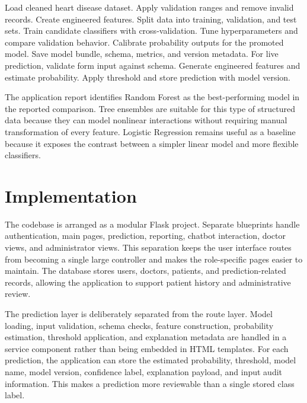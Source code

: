 \documentclass[conference]{IEEEtran}
\begin{document}
\begin{algorithm}[!t]
\caption{HeartCareAI Training and Prediction Workflow}
\label{alg:workflow}
\begin{algorithmic}[1]
\STATE Load cleaned heart disease dataset.
\STATE Apply validation ranges and remove invalid records.
\STATE Create engineered features.
\STATE Split data into training, validation, and test sets.
\STATE Train candidate classifiers with cross-validation.
\STATE Tune hyperparameters and compare validation behavior.
\STATE Calibrate probability outputs for the promoted model.
\STATE Save model bundle, schema, metrics, and version metadata.
\STATE For live prediction, validate form input against schema.
\STATE Generate engineered features and estimate probability.
\STATE Apply threshold and store prediction with model version.
\end{algorithmic}
\end{algorithm}

The application report identifies Random Forest as the best-performing model in the reported comparison. Tree ensembles are suitable for this type of structured data because they can model nonlinear interactions without requiring manual transformation of every feature. Logistic Regression remains useful as a baseline because it exposes the contrast between a simpler linear model and more flexible classifiers.

\section{Implementation}
The codebase is arranged as a modular Flask project. Separate blueprints handle authentication, main pages, prediction, reporting, chatbot interaction, doctor views, and administrator views. This separation keeps the user interface routes from becoming a single large controller and makes the role-specific pages easier to maintain. The database stores users, doctors, patients, and prediction-related records, allowing the application to support patient history and administrative review.

The prediction layer is deliberately separated from the route layer. Model loading, input validation, schema checks, feature construction, probability estimation, threshold application, and explanation metadata are handled in a service component rather than being embedded in HTML templates. For each prediction, the application can store the estimated probability, threshold, model name, model version, confidence label, explanation payload, and input audit information. This makes a prediction more reviewable than a single stored class label.
\end{document}
